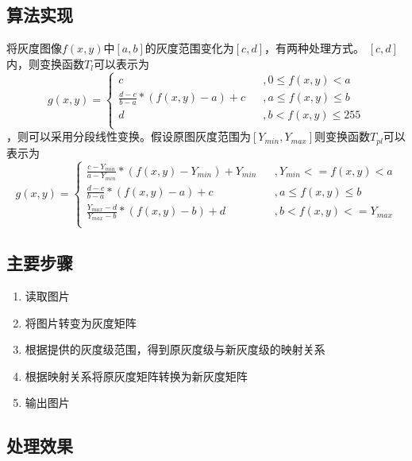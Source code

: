\documentclass[UTF8]{ctexart}
\begin{document}
		\subsection{算法实现}
		将灰度图像$f(x,y)$中$[a,b]$的灰度范围变化为$[c,d]$，有两种处理方式。\newline
		$[c,d]$内，则变换函数$T_l$可以表示为
		\[
		g(x,y)=\left\{
		\begin{array}{lcl}
		c & & ,{0 \leq f(x,y) < a} \\
		\frac{d-c}{b-a} * (f(x,y)-a) + c & & ,{a \leq f(x,y) \leq b} \\
		d & & ,{b < f(x,y) \leq 255} \\
		\end{array}\right.
		\]
		，则可以采用分段线性变换。假设原图灰度范围为$[Y_{min},Y_{max}]$则变换函数$T_{pl}$可以表示为
		\[
		g(x,y)=\left\{
		\begin{array}{lcl}
		\frac{c-Y_{min}}{a-Y_{min}} * (f(x,y)-Y_{min}) + Y_{min} & & ,{Y_{min} <= f(x,y) < a} \\
		\frac{d-c}{b-a} * (f(x,y)-a) + c & & ,{a \leq f(x,y) \leq b} \\
		\frac{Y_{max}-d}{Y_{max}-b} * (f(x,y)-b) + d & & ,{b < f(x,y) <= Y_{max}} \\
		\end{array}\right.
		\]

		\subsection{主要步骤}
			\begin{enumerate} [(1)]
				\item 读取图片
				\item 将图片转变为灰度矩阵
				\item 根据提供的灰度级范围，得到原灰度级与新灰度级的映射关系
				\item 根据映射关系将原灰度矩阵转换为新灰度矩阵
				\item 输出图片
			\end{enumerate}


		\subsection{处理效果}
\end{document}
